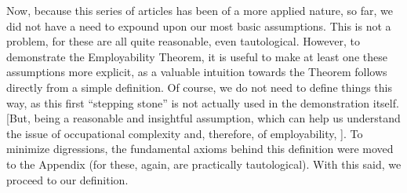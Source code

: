 \documentclass[nonatbib]{elsarticle}
\begin{document}

Now, because this series of articles has been of a more applied nature, so far, we did not have a need to expound upon our most basic assumptions. This is not a problem, for these are all quite reasonable, even tautological. However, to demonstrate the Employability Theorem, it is useful to make at least one these assumptions more explicit, as a valuable intuition towards the Theorem follows directly from a simple definition. Of course, we do not need to define things this way, as this first ``stepping stone'' is not actually used in the demonstration itself. [But, being a reasonable and insightful assumption, which can help us understand the issue of occupational complexity and, therefore, of employability, ]. To minimize digressions, the fundamental axioms behind this definition were moved to the Appendix (for these, again, are practically tautological). With this said, we proceed to our definition.

\SklTasks
\SklDifficulty
\SSL
\end{document}
